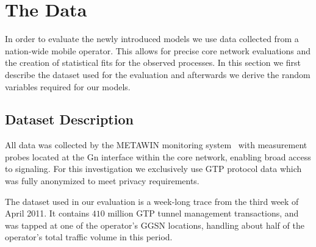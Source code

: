 \section{The Data}
\label{sec:dataset}
In order to evaluate the newly introduced models we use data collected from a nation-wide mobile operator. This allows for precise core network evaluations and the creation of statistical fits for the observed processes.
In this section we first describe the dataset used for the evaluation and afterwards we derive the random variables required for our models.

\subsection{Dataset Description}
\label{sec:dataset_description}
All data was collected by the \gls{METAWIN} monitoring system~\cite{ricciato_2011} with measurement probes located at the Gn interface within the core network, enabling broad access to signaling. For this investigation we exclusively use \gls{GTP} protocol data which was fully anonymized to meet privacy requirements.

The dataset used in our evaluation is a week-long trace from the third week of April 2011. It contains $410$ million \gls{GTP} tunnel management transactions, and was tapped at one of the operator's \gls{GGSN} locations, handling about half of the operator's total traffic volume in this period.

